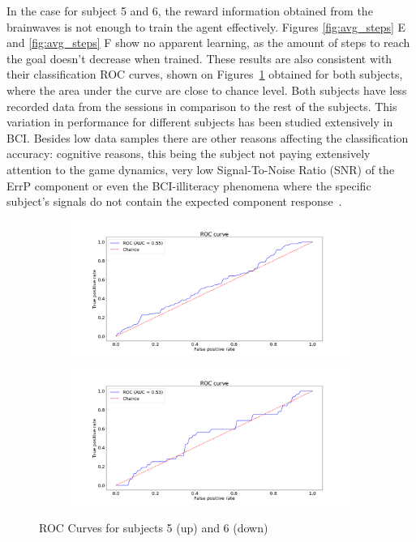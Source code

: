 \documentclass[journal]{IEEEtran}
\begin{document}
{{In the case for subject 5 and 6, the reward information obtained from the brainwaves is not enough to train the agent effectively. Figures \ref{fig:avg_steps} E and \ref{fig:avg_steps} F show no apparent learning, as the amount of steps to reach the goal doesn't decrease when trained.  These results are also consistent with their classification ROC curves, shown on Figures~\ref{fig:rocsubjects} obtained for both subjects, where the area under the curve are close to chance level.  Both subjects have less recorded data from the sessions in comparison to the rest of the subjects.   This variation in performance for different subjects has been studied extensively in BCI.  Besides low data samples there are other reasons affecting the classification accuracy:  cognitive reasons, this being the subject not paying extensively attention to the game dynamics, very low Signal-To-Noise Ratio (SNR) of the ErrP component or even the BCI-illiteracy phenomena where the specific subject's signals do not contain the expected component response~\cite{Yousefi2019}.

\begin{figure}[h!]
\captionsetup[subfigure]{justification=centering}
\begin{subfigure}{0.25\textwidth}
    \centering
    \includegraphics[scale=0.2]{Images/Classification_test/roc_e.png}
\end{subfigure}
\begin{subfigure}{0.25\textwidth}
    \centering
    \includegraphics[scale=0.2]{Images/Classification_test/roc_f.png}  
\end{subfigure}
\caption{ROC Curves for subjects 5 (up) and 6 (down)}
\label{fig:rocsubjects}
\end{figure}

}}
\end{document}
